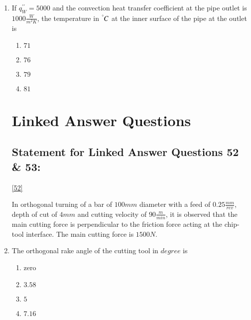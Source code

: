 \documentclass[journal]{IEEEtran}
\numberwithin{equation}{enumi}
\numberwithin{figure}{enumi}
\begin{document}
\begin{enumerate}
    \item
    If $q_W^{\prime\prime} = 5000$ and the convection heat transfer coefficient at the pipe outlet is $1000\frac{W}{m^2K}$, the temperature in $^\degree C$ at the inner surface of the pipe at the outlet is \label{51}
    \hfill{}

    \begin{multicols}{4}
        \begin{enumerate}
            \item $71$
            \item $76$
            \item $79$
            \item $81$
        \end{enumerate}
    \end{multicols}

    \section{Linked Answer Questions}
    \subsection{Statement for Linked Answer Questions 52 \& 53: }\ref{52}
        
    In orthogonal turning of a bar of $100 mm$ diameter with a feed of $0.25 \frac{mm}{rev}$, depth of cut of $4 mm$ and cutting velocity of $90 \frac{m}{min}$, it is observed that the main  cutting force is perpendicular to the friction force acting at the chip-tool interface. The main  cutting force is $1500 N$.\\

    \item 
    The orthogonal rake angle of the cutting tool in $degree$ is \label{52}
    \hfill{}
    \begin{multicols}{4}
        \begin{enumerate}
            \item zero
            \item $3.58$
            \item $5$
            \item $7.16$
        \end{enumerate}
    \end{multicols}

\end{enumerate}
\end{document}
